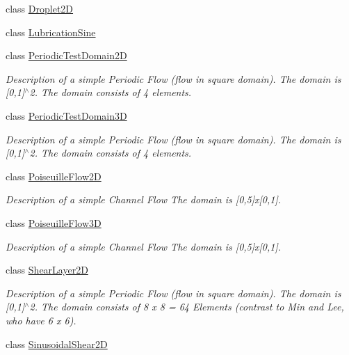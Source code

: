 \begin{DoxyCompactItemize}
class \hyperlink{classnatrium_1_1Droplet2D}{Droplet2D}
\item 
class \hyperlink{classnatrium_1_1LubricationSine}{LubricationSine}
\item 
class \hyperlink{classnatrium_1_1PeriodicTestDomain2D}{PeriodicTestDomain2D}
\begin{DoxyCompactList}\small\item\em Description of a simple Periodic Flow (flow in square domain). The domain is \mbox{[}0,1\mbox{]}$^\wedge$2. The domain consists of 4 elements. \item\end{DoxyCompactList}\item 
class \hyperlink{classnatrium_1_1PeriodicTestDomain3D}{PeriodicTestDomain3D}
\begin{DoxyCompactList}\small\item\em Description of a simple Periodic Flow (flow in square domain). The domain is \mbox{[}0,1\mbox{]}$^\wedge$2. The domain consists of 4 elements. \item\end{DoxyCompactList}\item 
class \hyperlink{classnatrium_1_1PoiseuilleFlow2D}{PoiseuilleFlow2D}
\begin{DoxyCompactList}\small\item\em Description of a simple Channel Flow The domain is \mbox{[}0,5\mbox{]}x\mbox{[}0,1\mbox{]}. \item\end{DoxyCompactList}\item 
class \hyperlink{classnatrium_1_1PoiseuilleFlow3D}{PoiseuilleFlow3D}
\begin{DoxyCompactList}\small\item\em Description of a simple Channel Flow The domain is \mbox{[}0,5\mbox{]}x\mbox{[}0,1\mbox{]}. \item\end{DoxyCompactList}\item 
class \hyperlink{classnatrium_1_1ShearLayer2D}{ShearLayer2D}
\begin{DoxyCompactList}\small\item\em Description of a simple Periodic Flow (flow in square domain). The domain is \mbox{[}0,1\mbox{]}$^\wedge$2. The domain consists of 8 x 8 = 64 Elements (contrast to Min and Lee, who have 6 x 6). \item\end{DoxyCompactList}\item 
class \hyperlink{classnatrium_1_1SinusoidalShear2D}{SinusoidalShear2D}

\end{DoxyCompactItemize}
